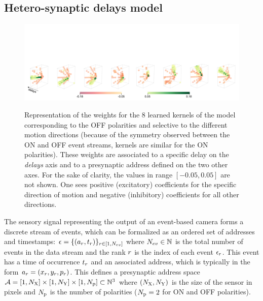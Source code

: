 \documentclass[default]{sn-jnl}%
\theoremstyle{thmstyleone}%
\theoremstyle{thmstyletwo}%
\theoremstyle{thmstylethree}%
\begin{document}
\subsection{Hetero-synaptic delays model}
%
\begin{figure}[ht!]
    {\centering
    \vspace{-3cm}
    \includegraphics[width=\linewidth]{figures/3D_kernels_oneline.png}
    }
    \caption{
    	Representation of the weights for the $8$ learned kernels of the model corresponding to the OFF polarities and selective to the different motion directions
	(because of the symmetry observed between the ON and OFF event streams, kernels are similar for the ON polarities). These weights are associated to a specific delay on the \textit{delays} axis and to a presynaptic address defined on the two other axes.
	For the sake of clarity, the values in range $[-0.05, 0.05]$ are not shown. One sees positive (excitatory) coefficients for the specific direction of motion and negative (inhibitory) coefficients for all other directions.
	}
    \label{fig:kernels}
\end{figure} 
%
The sensory signal representing the output of an event-based camera forms a discrete stream of events, which can be formalized as an ordered set of addresses and timestamps: $\epsilon = \{(a_r, t_r)\}_{r \in [1,N_{ev}]}$ where $N_{ev} \in \mathbb{N} $ is the total number of events in the data stream and the rank $r$ is the index of each event $\epsilon_r$. 
This event has a time of occurrence $t_r$  and an associated address, which is typically in the form $a_r=(x_r, y_r, p_r)$.
This defines a presynaptic address space $\mathcal{A} = [1, N_\text{X}]\times[1, N_\text{Y}] \times [1, N_\text{p}] \subset \mathbb{N}^3$ where $(N_\text{X}, N_\text{Y})$ is the size of the sensor in pixels and $N_\text{p}$ is the number of polarities  ($N_\text{p}=2$ for ON and OFF polarities).
\end{document}
